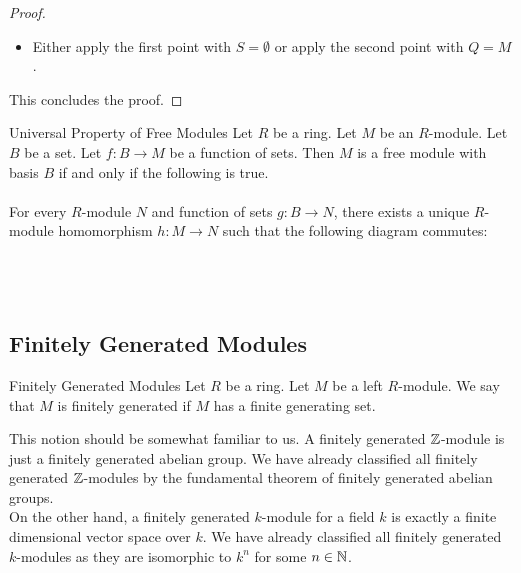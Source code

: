 \documentclass[a4paper]{article}
\begin{document}
\begin{thm}{}{}
\begin{proof}
\begin{itemize}
Suppose that this is false. Then there exists $q\in Q$ such that $q$ is not a linear combination of $Z$. By a similar argument as above, $Z\cup\{q\}$ is a bigger element of $\mP$, contradicting the fact that $Z$ is maximal. Thus we are done. 

\item Either apply the first point with $S=\emptyset$ or apply the second point with $Q=M$. 
\end{itemize}
This concludes the proof. 
\end{proof}
\end{thm}

\begin{thm}{Universal Property of Free Modules}{} Let $R$ be a ring. Let $M$ be an $R$-module. Let $B$ be a set. Let $f:B\to M$ be a function of sets. Then $M$ is a free module with basis $B$ if and only if the following is true. \\~\\

For every $R$-module $N$ and function of sets $g:B\to N$, there exists a unique $R$-module homomorphism $h:M\to N$ such that the following diagram commutes: \\~\\
\\~\\
\end{thm}

\subsection{Finitely Generated Modules}
\begin{defn}{Finitely Generated Modules}{} Let $R$ be a ring. Let $M$ be a left $R$-module. We say that $M$ is finitely generated if $M$ has a finite generating set. 
\end{defn}

This notion should be somewhat familiar to us. A finitely generated $\mathbb{Z}$-module is just a finitely generated abelian group. We have already classified all finitely generated $\mathbb{Z}$-modules by the fundamental theorem of finitely generated abelian groups. \\

On the other hand, a finitely generated $k$-module for a field $k$ is exactly a finite dimensional vector space over $k$. We have already classified all finitely generated $k$-modules as they are isomorphic to $k^n$ for some $n\in\mathbb{N}$. 
\end{document}
